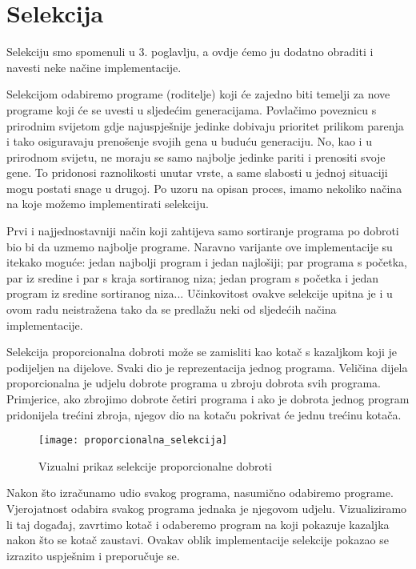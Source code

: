 \section{Selekcija}
\quad Selekciju smo spomenuli u 3. poglavlju, a ovdje ćemo ju dodatno obraditi i navesti neke načine implementacije.\par
 Selekcijom odabiremo programe (roditelje) koji će zajedno biti temelji za nove programe koji će se uvesti u sljedećim generacijama. Povlačimo poveznicu s prirodnim svijetom gdje najuspješnije jedinke dobivaju prioritet prilikom parenja i tako osiguravaju prenošenje svojih gena u buduću generaciju. No, kao i u prirodnom svijetu, ne moraju se samo najbolje jedinke pariti i prenositi svoje gene. To pridonosi raznolikosti unutar vrste, a same slabosti u jednoj situaciji mogu postati snage u drugoj. Po uzoru na opisan proces, imamo nekoliko načina na koje možemo implementirati selekciju.
 \par 
 Prvi i najjednostavniji način koji zahtijeva samo sortiranje programa po dobroti bio bi da uzmemo najbolje programe. Naravno varijante ove implementacije su itekako moguće: jedan najbolji program i jedan najlošiji; par programa s početka, par iz sredine i par s kraja sortiranog niza; jedan program s početka i jedan program iz sredine sortiranog niza... Učinkovitost ovakve selekcije upitna je i u ovom radu neistražena tako da se predlažu neki od sljedećih načina implementacije.\par 
 Selekcija proporcionalna dobroti može se zamisliti kao kotač s kazaljkom koji je podijeljen na dijelove. Svaki dio je reprezentacija jednog programa. Veličina dijela proporcionalna je udjelu dobrote programa u zbroju dobrota svih programa. Primjerice, ako zbrojimo dobrote četiri programa i ako je dobrota jednog program pridonijela trećini zbroja, njegov dio na kotaču pokrivat će jednu trećinu kotača.\newline
 \begin{figure}[h]
 	\centering
 	\texttt{[image: proporcionalna\_selekcija]}
 	\caption{Vizualni prikaz selekcije proporcionalne dobroti}
 \end{figure}
 \par 
  Nakon što izračunamo udio svakog programa, nasumično odabiremo programe. Vjerojatnost odabira svakog programa jednaka je njegovom udjelu. Vizualiziramo li taj događaj, zavrtimo kotač i odaberemo program na koji pokazuje kazaljka nakon što se kotač zaustavi. Ovakav oblik implementacije selekcije pokazao se izrazito uspješnim i preporučuje se.
